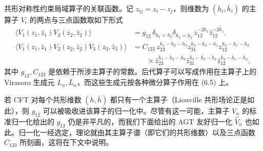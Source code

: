  共形对称性约束局域算子的关联函数。记 $z_{ij}=z_i-z_j$，则维数为 $(h_i,\bar h_i)$ 的主算子 $V_i$ 的两点与三点函数取如下形式
\begin{align}
  \langle V_1(z_1,\bar z_1)V_2(z_2,\bar z_2)\rangle &= g_{12}\,\delta_{h_1=h_2}\delta_{\bar h_1=\bar h_2}\,z_{12}^{-2h_1}\bar z_{12}^{-2\bar h_1}, \nonumber\\
  \langle V_1(z_1,\bar z_1)V_2(z_2,\bar z_2)V_3(z_3,\bar z_3)\rangle &= C_{123}\,z_{23}^{h_1-h_2-h_3}z_{31}^{h_2-h_3-h_1}z_{12}^{h_3-h_1-h_2} \nonumber\\
  &\qquad\times\bar z_{23}^{\bar h_1-\bar h_2-\bar h_3}\bar z_{31}^{\bar h_2-\bar h_3-\bar h_1}\bar z_{12}^{\bar h_3-\bar h_1-\bar h_2},
  \tag{6.5}
\end{align}
其中 $g_{12},C_{123}$ 是依赖于所涉主算子的常数。后代算子可以写成作用在主算子上的 Virasoro 生成元 $L_n,\bar L_n$，而这些生成元按各种微分算子作用在 (6.5) 上。

若 CFT 对每个共形维数 $(h,\bar h)$ 都只有一个主算子（Liouville 共形场论正是如此），则 $g_{12}$ 可以被吸收进该算子的归一化中。尽管有这一可能，主算子 $V_\alpha$ 的标准归一化给出的 $g_{12}$ 仍是非平凡的，而我们下面给出的 AGT 友好归一化 $\hat V_\alpha$ 也如此。归一化一经选定，理论就由其主算子谱（即它们的共形维数）以及三点函数 $C_{123}$ 所刻画，这将在下文中说明。

